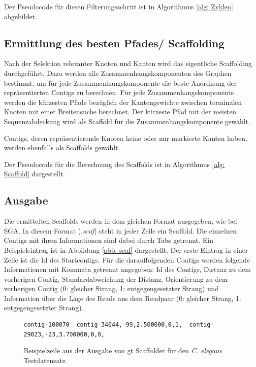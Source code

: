 \documentclass[a4paper,10pt,parskip]{scrartcl}
\begin{document}
Der Pseudocode für diesen Filterungsschritt ist in Algorithmus
\ref{alg: Zyklen} abgebildet.

\subsection{Ermittlung des besten Pfades/ Scaffolding}

Nach der Selektion relevanter Knoten und Kanten wird das eigentliche
Scaffolding durchgeführt. Dazu werden alle Zusammenhangskomponenten
des Graphen bestimmt, um für jede Zusammenhangskomponente die beste
Anordnung der repräsentierten Contigs zu berechnen. Für jede
Zusammenhangskomponente werden die kürzesten Pfade bezüglich der
Kantengewichte zwischen terminalen Knoten mit einer Breitensuche
berechnet. Der kürzeste Pfad mit der meisten Sequenzabdeckung wird als
Scaffold für die Zusammenhangskomponente gewählt.

Contigs, deren repräsentierende Knoten keine oder nur markierte Kanten
haben, werden ebenfalls als Scaffolds gewählt.

Der Pseudocode für die Berechnung des Scaffolds ist in Algorithmus
\ref{alg: Scaffold} dargestellt.

\subsection{Ausgabe}
Die ermittelten Scaffolds werden in dem gleichen Format ausgegeben,
wie bei SGA. In diesem Format (\textit{.scaf}) steht in jeder Zeile
ein Scaffold. Die einzelnen Contigs mit ihren Informationen sind dabei
durch Tabs getrennt. Ein Beispieleintrag ist in Abbildung \ref{abb:
  scaf} dargestellt. Der erste Eintrag in einer Zeile ist die Id des
Startcontigs. Für die darauffolgenden Contigs werden folgende
Informationen mit Kommata getrennt angegeben: Id des Contigs, Distanz
zu dem vorherigen Contig, Standardabweichung der Distanz, Orientierung
zu dem vorherigen Contig (0: gleicher Strang, 1: entgegengesetzter
Strang) und Information über die Lage des Reads aus dem Readpaar (0:
gleicher Strang, 1: entgegengesetzter Strang).

\begin{figure}
\begin{verbatim}
contig-100070  contig-34044,-99,2.500000,0,1,  contig-29023,-23,3.700000,0,0,
\end{verbatim}
\caption{\label{abb: scaf}Beispielzeile aus der Ausgabe von gt
  Scaffolder für den \textit{C. elegans} Testdatensatz.}
\end{figure}
\end{document}
